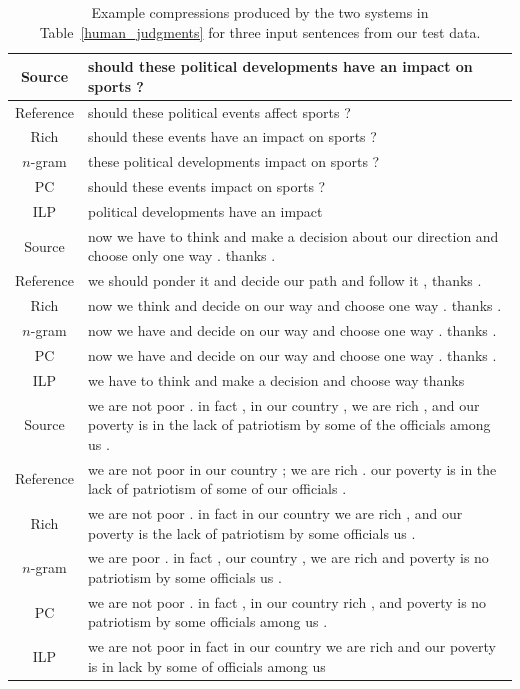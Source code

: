 \documentclass[11pt]{article}
\begin{document}
\begin{table}[!th]
\begin{center}
\small
{
\renewcommand{\arraystretch}{1.5}
\begin{tabular}{|c|>{\raggedright}m{13.2cm}|}
  \hline

  Source & should these political developments have an impact on sports
  ? \tabularnewline
  \hline
  Reference & should these political events affect sports ? \tabularnewline
  \hline
  Rich & should these events have an impact on sports ? \tabularnewline
  \hline
  $n$-gram & these political developments impact on sports ? \tabularnewline
  \hline
  PC & should these events impact on sports ? \tabularnewline
  \hline
  ILP & political developments have an impact \tabularnewline
  \hline
  \hline

  Source & now we have to think and make a decision about our direction
  and choose only one way . thanks . \tabularnewline
  \hline
  Reference & we should ponder it and decide our path and follow it , thanks
  . \tabularnewline
  \hline
  Rich & now we think and decide on our way and choose one way . thanks
  . \tabularnewline
  \hline
  $n$-gram & now we have and decide on our way and choose one way . thanks
  . \tabularnewline
  \hline
  PC & now we have and decide on our way and choose one way . thanks
  . \tabularnewline
  \hline
  ILP &  we have to think and make a decision and choose way thanks
  \tabularnewline
  \hline
  \hline

  Source &  we are not poor . in fact , in our country , we are rich , and
  our poverty is in the lack of patriotism by some of the officials
  among us . \tabularnewline
  \hline
  Reference &  we are not poor in our country ; we are rich . our poverty is
  in the lack of patriotism of some of our officials . \tabularnewline
  \hline
  Rich & we are not poor . in fact in our country we are rich , and our
  poverty is the lack of patriotism by some officials us
  . \tabularnewline
  \hline
  $n$-gram & we are poor . in fact , our country , we are rich and
  poverty is no patriotism by some officials us . \tabularnewline
  \hline
  PC & we are not poor . in fact , in our country rich , and poverty
  is no patriotism by some officials among us . \tabularnewline
  \hline
  ILP & we are not poor in fact in our country we are rich and our
  poverty is in lack by some of officials among us \tabularnewline
  \hline
\end{tabular}
}
\normalsize
\end{center}
\caption{Example compressions produced by the two systems in
  Table~\ref{human_judgments} for three input sentences from our test
  data.}
\label{test_examples}
\end{table}
\end{document}
